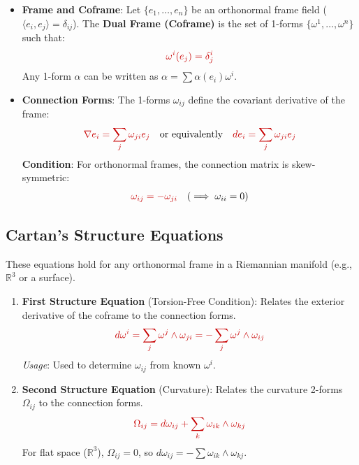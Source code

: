\documentclass[a4paper,12pt]{article}
\newcommand{\key}[1]{\textcolor{keywordcolor}{\textbf{#1}}}
\newcommand{\formula}[1]{\textcolor{formulacolor}{#1}}
\begin{document}
\begin{itemize}
    \item \key{Frame and Coframe}:
    Let $\{e_1, \dots, e_n\}$ be an orthonormal frame field ($\langle e_i, e_j \rangle = \delta_{ij}$).
    The \key{Dual Frame (Coframe)} is the set of 1-forms $\{\omega^1, \dots, \omega^n\}$ such that:
    \begin{equation}
        \formula{\omega^i(e_j) = \delta^i_j}
    \end{equation}
    Any 1-form $\alpha$ can be written as $\alpha = \sum \alpha(e_i)\omega^i$.
    
    \item \key{Connection Forms}:
    The 1-forms $\omega_{ij}$ define the covariant derivative of the frame:
    \begin{equation}
        \formula{\nabla e_i = \sum_j \omega_{ji} e_j} \quad \text{or equivalently} \quad \formula{d e_i = \sum_j \omega_{ji} e_j}
    \end{equation}
    \textbf{Condition}: For orthonormal frames, the connection matrix is skew-symmetric:
    \begin{equation}
        \formula{\omega_{ij} = -\omega_{ji}} \quad (\implies \omega_{ii} = 0)
    \end{equation}
\end{itemize}

\subsection{Cartan's Structure Equations}

These equations hold for any orthonormal frame in a Riemannian manifold (e.g., $\mathbb{R}^3$ or a surface).

\begin{enumerate}
    \item \key{First Structure Equation} (Torsion-Free Condition):
    Relates the exterior derivative of the coframe to the connection forms.
    \begin{equation}
        \formula{d\omega^i = \sum_j \omega^j \wedge \omega_{ji} = -\sum_j \omega^j \wedge \omega_{ij}}
    \end{equation}
    \textit{Usage}: Used to determine $\omega_{ij}$ from known $\omega^i$.

    \item \key{Second Structure Equation} (Curvature):
    Relates the curvature 2-forms $\Omega_{ij}$ to the connection forms.
    \begin{equation}
        \formula{\Omega_{ij} = d\omega_{ij} + \sum_k \omega_{ik} \wedge \omega_{kj}}
    \end{equation}
    For flat space ($\mathbb{R}^3$), $\Omega_{ij} = 0$, so $d\omega_{ij} = -\sum \omega_{ik} \wedge \omega_{kj}$.
\end{enumerate}
\end{document}
